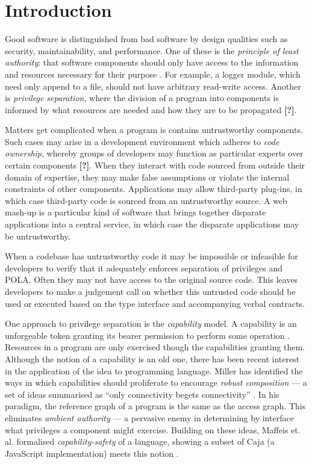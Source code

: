 \chapter{Introduction}\label{C:intro}

Good software is distinguished from bad software by design qualities such as security, maintainability, and performance. One of these is the \textit{principle of least authority}: that software components should only have access to the information and resources necessary for their purpose \cite{saltzer74}. For example, a logger module, which need only append to a file, should not have arbitrary read-write access. Another is \textit{privilege separation}, where the division of a program into components is informed by what resources are needed and how they are to be propagated \textbf{[?]}.

Matters get complicated when a program is contains untrustworthy components. Such cases may arise in a development environment which adheres to \textit{code ownership}, whereby groups of developers may function as particular experts over certain components \textbf{[?]}. When they interact with code sourced from outside their domain of expertise, they may make false assumptions or violate the internal constraints of other components. Applications may allow third-party plug-ins, in which case third-party code is sourced from an untrustworthy source. A web mash-up is a particular kind of software that brings together disparate applications into a central service, in which case the disparate applications may be untrustworthy.

When a codebase has untrustworthy code it may be impossible or infeasible for developers to verify that it adequately enforces separation of privileges and POLA. Often they may not have access to the original source code. This leaves developers to make a judgement call on whether this untrusted code should be used or executed based on the type interface and accompanying verbal contracts.

One approach to privilege separation is the \textit{capability} model. A capability is an unforgeable token granting its bearer permission to perform some operation \cite{dennis66}. Resources in a program are only exercised though the capabilities granting them. Although the notion of a capability is an old one, there has been recent interest in the application of the idea to programming language. Miller has identified the ways in which capabilities should proliferate to encourage \textit{robust composition} --- a set of ideas summarised as ``only connectivity begets connectivity'' \cite{miller06}. In his paradigm, the reference graph of a program is the same as the access graph. This eliminates \textit{ambient authority} --- a pervasive enemy in determining by interface what privileges a component might exercise. Building on these ideas, Maffeis et. al. formalised \textit{capability-safety} of a language, showing a subset of Caja (a JavaScript implementation) meets this notion \cite{maffeis10}.

